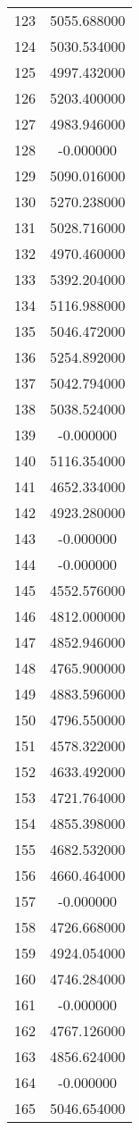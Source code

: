 \documentclass[12pt]{article}
\begin{document}
\begin{longtable}{@{}cc@{}}
123 & 5055.688000 \\
124 & 5030.534000 \\
125 & 4997.432000 \\
126 & 5203.400000 \\
127 & 4983.946000 \\
128 & -0.000000 \\
129 & 5090.016000 \\
130 & 5270.238000 \\
131 & 5028.716000 \\
132 & 4970.460000 \\
133 & 5392.204000 \\
134 & 5116.988000 \\
135 & 5046.472000 \\
136 & 5254.892000 \\
137 & 5042.794000 \\
138 & 5038.524000 \\
139 & -0.000000 \\
140 & 5116.354000 \\
141 & 4652.334000 \\
142 & 4923.280000 \\
143 & -0.000000 \\
144 & -0.000000 \\
145 & 4552.576000 \\
146 & 4812.000000 \\
147 & 4852.946000 \\
148 & 4765.900000 \\
149 & 4883.596000 \\
150 & 4796.550000 \\
151 & 4578.322000 \\
152 & 4633.492000 \\
153 & 4721.764000 \\
154 & 4855.398000 \\
155 & 4682.532000 \\
156 & 4660.464000 \\
157 & -0.000000 \\
158 & 4726.668000 \\
159 & 4924.054000 \\
160 & 4746.284000 \\
161 & -0.000000 \\
162 & 4767.126000 \\
163 & 4856.624000 \\
164 & -0.000000 \\
165 & 5046.654000 \\

\end{longtable}
\end{document}
